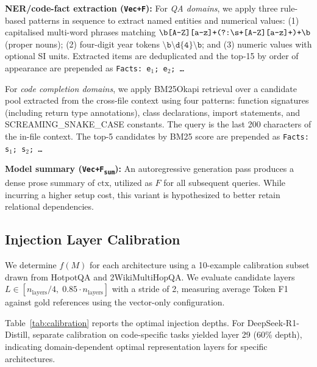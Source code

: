 \documentclass[11pt]{article}
\newcommand{\ctx}{\mathrm{ctx}}
\begin{document}
\textbf{NER/code-fact extraction (\texttt{Vec+F}):} For \emph{QA domains}, we apply three rule-based patterns in sequence to extract named entities and numerical values: (1) capitalised multi-word phrases matching $\texttt{\textbackslash b[A\text{-}Z][a\text{-}z]+(?:\textbackslash s+[A\text{-}Z][a\text{-}z]+)+\textbackslash b}$ (proper nouns); (2) four-digit year tokens $\texttt{\textbackslash b\textbackslash d\{4\}\textbackslash b}$; and (3) numeric values with optional SI units. Extracted items are deduplicated and the top-15 by order of appearance are prepended as \texttt{Facts: e$_1$; e$_2$; \ldots}

For \emph{code completion domains}, we apply BM25Okapi retrieval over a candidate pool extracted from the cross-file context using four patterns: function signatures (including return type annotations), class declarations, import statements, and SCREAMING\_SNAKE\_CASE constants. The query is the last 200 characters of the in-file context. The top-5 candidates by BM25 score are prepended as \texttt{Facts: s$_1$; s$_2$; \ldots}

\textbf{Model summary (\texttt{Vec+F\textsubscript{sum}}):} An autoregressive generation pass produces a dense prose summary of $\ctx$, utilized as $F$ for all subsequent queries. While incurring a higher setup cost, this variant is hypothesized to better retain relational dependencies.

\subsection{Injection Layer Calibration}
\label{sec:calibration}
We determine $f(M)$ for each architecture using a 10-example calibration subset drawn from HotpotQA and 2WikiMultiHopQA. We evaluate candidate layers $L \in [n_\text{layers}/4,\; 0.85 \cdot n_\text{layers}]$ with a stride of 2, measuring average Token F1 against gold references using the vector-only configuration.

Table~\ref{tab:calibration} reports the optimal injection depths. For DeepSeek-R1-Distill, separate calibration on code-specific tasks yielded layer 29 (60\% depth), indicating domain-dependent optimal representation layers for specific architectures.
\end{document}
